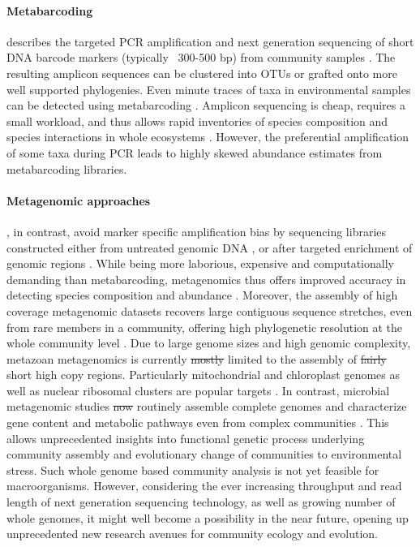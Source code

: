 \documentclass[12pt]{article}
\providecommand{\DIFaddtex}[1]{{\protect\color{blue}\uwave{#1}}} %
\providecommand{\DIFdeltex}[1]{{\protect\color{red}\sout{#1}}}                      %
\providecommand{\DIFaddbegin}{} %
\providecommand{\DIFaddend}{} %
\providecommand{\DIFdelbegin}{} %
\providecommand{\DIFdelend}{} %
\providecommand{\DIFadd}[1]{\texorpdfstring{\DIFaddtex{#1}}{#1}} %
\providecommand{\DIFdel}[1]{\texorpdfstring{\DIFdeltex{#1}}{}} %
\begin{document}
\paragraph{Metabarcoding} describes the targeted PCR amplification and
next generation sequencing of short DNA barcode markers (typically
~300-500 bp) from community samples \citep{Yu2012, ji2013}. The
resulting amplicon sequences can be clustered into OTUs or grafted
onto more well supported phylogenies. Even minute traces of taxa in
environmental samples can be detected using metabarcoding
\citep{bohmann2014}.  Amplicon sequencing is cheap, requires a small
workload, and thus allows rapid inventories of species composition and
species interactions in whole ecosystems \citep{gibson2014, leray2015,
  pompanon2012}. However, the preferential amplification of some taxa
during PCR leads to highly skewed abundance estimates
\citep{Yu2012, elbrecht2015} from metabarcoding libraries.

\paragraph{Metagenomic approaches}, in contrast, avoid marker specific
amplification bias by sequencing libraries constructed either from
untreated genomic DNA \citep{dodsworth2015, linard2015, tang2014}, or
after targeted enrichment of genomic regions \citep{liu2016}. While
being more laborious, expensive and computationally demanding than
metabarcoding, metagenomics thus offers improved accuracy in detecting
species composition and abundance \citep{zhou2013}. Moreover, the
assembly of high coverage metagenomic datasets recovers large
contiguous sequence stretches, even from rare members in a community,
offering high phylogenetic resolution at the whole community level
\citep{coissac2016}. Due to large genome sizes and high genomic
complexity, metazoan metagenomics is currently \DIFdelbegin \DIFdel{mostly }\DIFdelend limited to the
assembly of \DIFdelbegin \DIFdel{fairly }\DIFdelend short high copy regions. Particularly mitochondrial
and chloroplast genomes as well as nuclear ribosomal \DIFaddbegin \DIFadd{DNA }\DIFaddend clusters are
popular targets \citep{dodsworth2015, coissac2016}. 
In contrast, microbial metagenomic studies \DIFdelbegin \DIFdel{now }\DIFdelend routinely assemble complete genomes
and characterize gene content and metabolic pathways even from complex
communities \citep{nielsen2014}. This allows unprecedented insights
into functional genetic process underlying community assembly and
evolutionary change of communities to environmental stress.  Such
whole genome based community analysis is not yet feasible for
macroorganisms. However, considering the ever increasing throughput
and read length of next generation sequencing technology, as well as
growing number of whole genomes, it might well become a possibility in
the near future, opening up unprecedented new research avenues for
community ecology and evolution.
\end{document}
